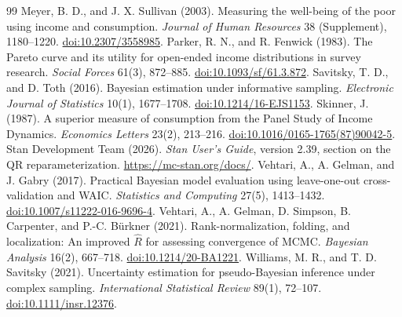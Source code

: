 \documentclass[11pt]{article}
\begin{document}
\begin{thebibliography}{99}
 Meyer, B. D., and J. X. Sullivan (2003). Measuring the well-being of the poor using income and consumption. \emph{Journal of Human Resources} 38 (Supplement), 1180--1220. \href{https://doi.org/10.2307/3558985}{doi:10.2307/3558985}.
 Parker, R. N., and R. Fenwick (1983). The Pareto curve and its utility for open-ended income distributions in survey research. \emph{Social Forces} 61(3), 872--885. \href{https://doi.org/10.1093/sf/61.3.872}{doi:10.1093/sf/61.3.872}.
 Savitsky, T. D., and D. Toth (2016). Bayesian estimation under informative sampling. \emph{Electronic Journal of Statistics} 10(1), 1677--1708. \href{https://doi.org/10.1214/16-EJS1153}{doi:10.1214/16-EJS1153}.
 Skinner, J. (1987). A superior measure of consumption from the Panel Study of Income Dynamics. \emph{Economics Letters} 23(2), 213--216. \href{https://doi.org/10.1016/0165-1765(87)90042-5}{doi:10.1016/0165-1765(87)90042-5}.
 Stan Development Team (2026). \emph{Stan User's Guide}, version 2.39, section on the QR reparameterization. \url{https://mc-stan.org/docs/}.
 Vehtari, A., A. Gelman, and J. Gabry (2017). Practical Bayesian model evaluation using leave-one-out cross-validation and WAIC. \emph{Statistics and Computing} 27(5), 1413--1432. \href{https://doi.org/10.1007/s11222-016-9696-4}{doi:10.1007/s11222-016-9696-4}.
 Vehtari, A., A. Gelman, D. Simpson, B. Carpenter, and P.-C. B{\"u}rkner (2021). Rank-normalization, folding, and localization: An improved $\widehat{R}$ for assessing convergence of MCMC. \emph{Bayesian Analysis} 16(2), 667--718. \href{https://doi.org/10.1214/20-BA1221}{doi:10.1214/20-BA1221}.
 Williams, M. R., and T. D. Savitsky (2021). Uncertainty estimation for pseudo-Bayesian inference under complex sampling. \emph{International Statistical Review} 89(1), 72--107. \href{https://doi.org/10.1111/insr.12376}{doi:10.1111/insr.12376}.
\end{thebibliography}
\endgroup
\end{document}
